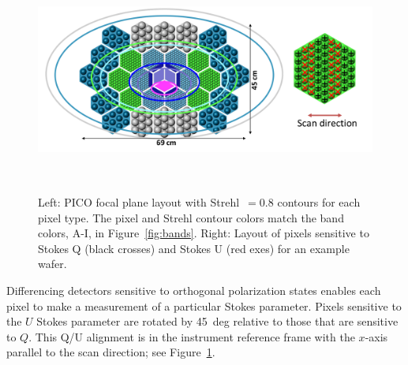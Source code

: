 \documentclass[]{spie}  %
\begin{document}
\begin{figure} [ht]
\begin{center}
\includegraphics[height=7.5cm]{version3_focal_plane_wQU.png}
\end{center}
\caption { \label{fig:focal_plane} \label{fig:QU} 
Left: PICO focal plane layout with Strehl~$=0.8$ contours for each pixel type. The pixel and Strehl contour colors match the band colors, A-I, 
in Figure~\ref{fig:bands}. 
Right: Layout of pixels sensitive to Stokes Q (black crosses) and Stokes U (red exes) for an example wafer.}
\end{figure} 

Differencing detectors sensitive to orthogonal polarization states enables each pixel to make a measurement of 
a particular Stokes parameter. Pixels sensitive to the $U$ Stokes parameter are rotated by 45~deg relative to those
that are sensitive to $Q$. This Q/U alignment is in the instrument reference frame with the $x$-axis parallel to the scan 
direction; see Figure~\ref{fig:QU}.

\end{document}
